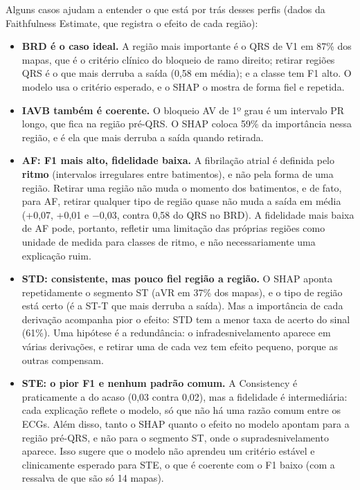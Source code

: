 \documentclass[11pt,a4paper]{article}
\begin{document}
Alguns casos ajudam a entender o que está por trás desses perfis (dados da Faithfulness Estimate, que registra o efeito de cada região):
\begin{itemize}
    \item \textbf{BRD é o caso ideal.} A região mais importante é o QRS de V1 em 87\% dos mapas, que é o critério clínico do bloqueio de ramo direito; retirar regiões QRS é o que mais derruba a saída (0,58 em média); e a classe tem F1 alto. O modelo usa o critério esperado, e o SHAP o mostra de forma fiel e repetida.
    \item \textbf{IAVB também é coerente.} O bloqueio AV de 1º grau é um intervalo PR longo, que fica na região pré-QRS. O SHAP coloca 59\% da importância nessa região, e é ela que mais derruba a saída quando retirada.
    \item \textbf{AF: F1 mais alto, fidelidade baixa.} A fibrilação atrial é definida pelo \textbf{ritmo} (intervalos irregulares entre batimentos), e não pela forma de uma região. Retirar uma região não muda o momento dos batimentos, e de fato, para AF, retirar qualquer tipo de região quase não muda a saída em média (+0,07, +0,01 e $-$0,03, contra 0,58 do QRS no BRD). A fidelidade mais baixa de AF pode, portanto, refletir uma limitação das próprias regiões como unidade de medida para classes de ritmo, e não necessariamente uma explicação ruim.
    \item \textbf{STD: consistente, mas pouco fiel região a região.} O SHAP aponta repetidamente o segmento ST (aVR em 37\% dos mapas), e o tipo de região está certo (é a ST-T que mais derruba a saída). Mas a importância de cada derivação acompanha pior o efeito: STD tem a menor taxa de acerto do sinal (61\%). Uma hipótese é a redundância: o infradesnivelamento aparece em várias derivações, e retirar uma de cada vez tem efeito pequeno, porque as outras compensam.
    \item \textbf{STE: o pior F1 e nenhum padrão comum.} A Consistency é praticamente a do acaso (0,03 contra 0,02), mas a fidelidade é intermediária: cada explicação reflete o modelo, só que não há uma razão comum entre os ECGs. Além disso, tanto o SHAP quanto o efeito no modelo apontam para a região pré-QRS, e não para o segmento ST, onde o supradesnivelamento aparece. Isso sugere que o modelo não aprendeu um critério estável e clinicamente esperado para STE, o que é coerente com o F1 baixo (com a ressalva de que são só 14 mapas).
\end{itemize}
\end{document}
